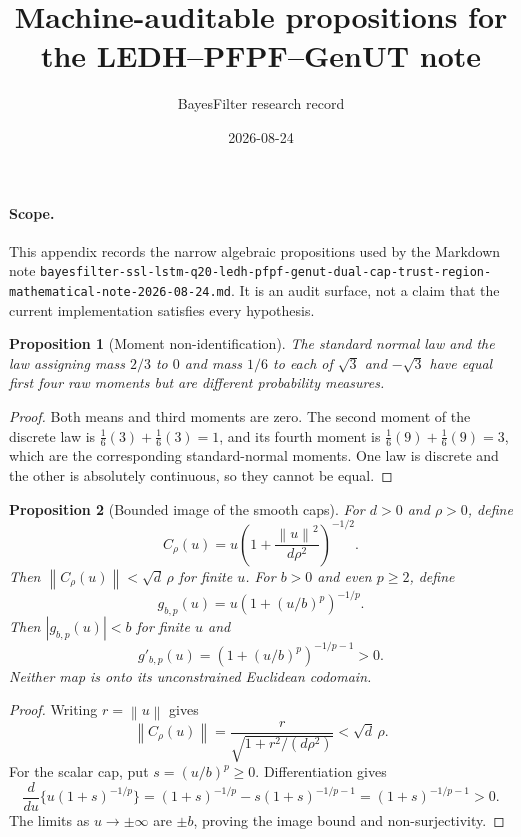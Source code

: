 \documentclass[11pt]{article}
\title{Machine-auditable propositions for the LEDH--PFPF--GenUT note}
\author{BayesFilter research record}
\date{2026-08-24}
\newtheorem{proposition}{Proposition}
\newcommand{\abs}[1]{\left|#1\right|}
\newcommand{\norm}[1]{\left\lVert#1\right\rVert}
\begin{document}
\maketitle

\paragraph{Scope.}
This appendix records the narrow algebraic propositions used by the Markdown
note
\texttt{bayesfilter-ssl-lstm-q20-ledh-pfpf-genut-dual-cap-trust-region-
mathematical-note-2026-08-24.md}.  It is an audit surface, not a claim that the
current implementation satisfies every hypothesis.

\begin{proposition}[Moment non-identification]
\label{prop:ledh-moment-nonidentification}
The standard normal law and the law assigning mass $2/3$ to $0$ and mass $1/6$
to each of $\sqrt{3}$ and $-\sqrt{3}$ have equal first four raw moments but are
different probability measures.
\end{proposition}
\begin{proof}
Both means and third moments are zero.  The second moment of the discrete law is
$\frac16(3)+\frac16(3)=1$, and its fourth moment is
$\frac16(9)+\frac16(9)=3$, which are the corresponding standard-normal
moments.  One law is discrete and the other is absolutely continuous, so they
cannot be equal.
\end{proof}

\begin{proposition}[Bounded image of the smooth caps]
\label{prop:ledh-cap-support}
For $d>0$ and $\rho>0$, define
\[
 C_\rho(u)=u\left(1+\frac{\norm{u}^2}{d\rho^2}\right)^{-1/2}.
\]
Then $\norm{C_\rho(u)}<\sqrt d\,\rho$ for finite $u$.  For $b>0$ and even
$p\geq2$, define
\[
 g_{b,p}(u)=u\left(1+(u/b)^p\right)^{-1/p}.
\]
Then $\abs{g_{b,p}(u)}<b$ for finite $u$ and
\[
 g'_{b,p}(u)=\left(1+(u/b)^p\right)^{-1/p-1}>0.
\]
Neither map is onto its unconstrained Euclidean codomain.
\end{proposition}
\begin{proof}
Writing $r=\norm{u}$ gives
\[
 \norm{C_\rho(u)}
 =\frac{r}{\sqrt{1+r^2/(d\rho^2)}}<\sqrt d\,\rho.
\]
For the scalar cap, put $s=(u/b)^p\geq0$.  Differentiation gives
\[
 \frac{d}{du}\{u(1+s)^{-1/p}\}
 =(1+s)^{-1/p}-s(1+s)^{-1/p-1}
 =(1+s)^{-1/p-1}>0.
\]
The limits as $u\to\pm\infty$ are $\pm b$, proving the image bound and
non-surjectivity.
\end{proof}
\end{document}
